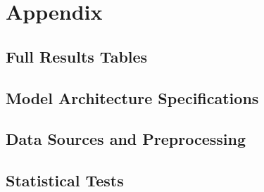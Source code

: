 \appendix
{}
\section*{Appendix}
\subsection*{Full Results Tables} \label{subec: appendix_full results tables}
\subsection*{Model Architecture Specifications} \label{subsec: appendix_model architecture specifications}
\subsection*{Data Sources and Preprocessing} \label{subsec: appendix_data sources and preprocessing}
\subsection*{Statistical Tests} \label{subsec: appendix_statistical tests}



